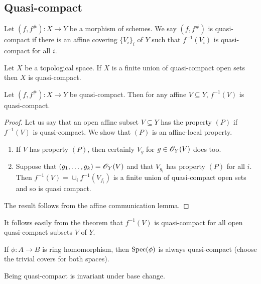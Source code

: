 \documentclass{memoir}
\begin{document}
\subsection{Quasi-compact}
\begin{definition}
    Let $(f,f^\#):X\to Y$ be a morphism of schemes.
    We say $(f,f^\#)$ is quasi-compact if there is an affine covering $\{V_i\}_i$ of $Y$ such that $f^{-1}(V_i)$ is quasi-compact for all $i$.
\end{definition}
\begin{lemma}
    Let $X$ be a topological space.
    If $X$ is a finite union of quasi-compact open sets then $X$ is quasi-compact.
\end{lemma}
\begin{thm}
    Let $(f,f^\#):X\to Y$ be quasi-compact.
    Then for any affine $V\subseteq Y$, $f^{-1}(V)$ is quasi-compact.
\end{thm}
\begin{proof}
    Let us say that an open affine subset $V\subseteq Y$ has the property $(P)$ if $f^{-1}(V)$ is quasi-compact.
    We show that $(P)$ is an affine-local property.
    \begin{enumerate}
        \item If $V$ has property $(P)$, then certainly $V_g$ for $g\in \mathscr{O}_Y(V)$ does too.
        \item Suppose that $(g_1,\dots,g_k) = \mathscr{O}_Y(V)$ and that $V_{g_i}$ has property $(P)$ for all $i$.
            Then $f^{-1}(V) = \cup_if^{-1}(V_{f_i})$ is a finite union of quasi-compact open sets and so is quasi compact.
    \end{enumerate}
    The result follows from the affine communication lemma.
\end{proof}
\begin{remark}
    It follows easily from the theorem that $f^{-1}(V)$ is quasi-compact for all open quasi-compact subsets $V$ of $Y$.
\end{remark}
\begin{remark}
    If $\phi:A\to B$ is ring homomorphism, then $\operatorname{Spec}(\phi)$ is always quasi-compact (choose the trivial covers for both spaces).
\end{remark}
\begin{proposition}
    Being quasi-compact is invariant under base change.
\end{proposition}
\end{document}
